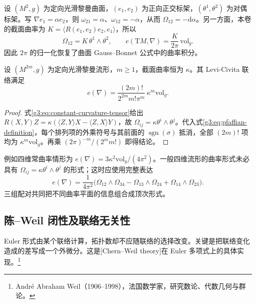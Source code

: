 \begin{example}\label{g3:exm:euler-surface-normalization}
	设 \((M^2,g)\) 为定向光滑黎曼曲面，\((e_1,e_2)\) 为正向正交标架，\((\theta^1,\theta^2)\) 为对偶标架。写 \(\nabla e_1=\alpha e_2\)，则 \(\omega_{21}=\alpha\)、\(\omega_{12}=-\alpha\)，从而 \(\Omega_{12}=-\mathrm d\alpha\)。另一方面，本卷的截面曲率为 \(K=\langle R(e_1,e_2)e_2,e_1\rangle\)，所以
	\[
		\Omega_{12}=K\,\theta^1\wedge\theta^2,
		\qquad e(\mathrm TM,\nabla)=\frac{K}{2\pi}\,\mathrm{vol}_g.
	\]
	因此 \(2\pi\) 的归一化恢复了曲面 Gauss--Bonnet 公式中的曲率积分。
\end{example}

\begin{proposition}\label{g3:prop:euler-constant-curvature}
	设 \((M^{2m},g)\) 为定向光滑黎曼流形，\(m\ge1\)，截面曲率恒为 \(\kappa\)。其 Levi-Civita 联络满足
	\begin{equation}\label{g3:eq:euler-space-form}
		e(\nabla)=\frac{(2m)!}{2^{2m}m!\pi^m}\,\kappa^m\mathrm{vol}_g.
	\end{equation}
\end{proposition}
\begin{proof}
	式\eqref{g3:eq:constant-curvature-tensor}给出 \(R(X,Y)Z=\kappa(\langle Z,Y\rangle X-\langle Z,X\rangle Y)\)，故 \(\Omega_{ij}=\kappa\theta^i\wedge\theta^j\)。代入式\eqref{g3:eq:pfaffian-definition}，每个排列项的外乘符号与其前面的 \(\operatorname{sgn}(\sigma)\) 抵消，全部 \((2m)!\) 项均为 \(\kappa^m\mathrm{vol}_g\)。再乘 \((2\pi)^{-m}/(2^m m!)\) 即得结论。
\end{proof}

例如四维常曲率情形为 \(e(\nabla)=3\kappa^2\mathrm{vol}_g/(4\pi^2)\)。一般四维流形的曲率形式未必具有 \(\Omega_{ij}=\kappa\theta^i\wedge\theta^j\) 的形式；这时应使用完整表达
\[
	e(\nabla)=\frac1{4\pi^2}
	\bigl(\Omega_{12}\wedge\Omega_{34}-\Omega_{13}\wedge\Omega_{24}
	+\Omega_{14}\wedge\Omega_{23}\bigr).
\]
三组配对共同把不同曲率平面的信息组合成顶次形式。

\subsection{陈–Weil 闭性及联络无关性}
\label{g3:subsec:1701:03}
Euler 形式由某个联络计算，拓扑数却不应随联络的选择改变。关键是把联络变化造成的差写成一个外微分。这是[Chern--Weil theory]在 Euler 多项式上的具体实现。\footnote{André Abraham Weil（1906--1998），法国数学家，研究数论、代数几何与群论。}


